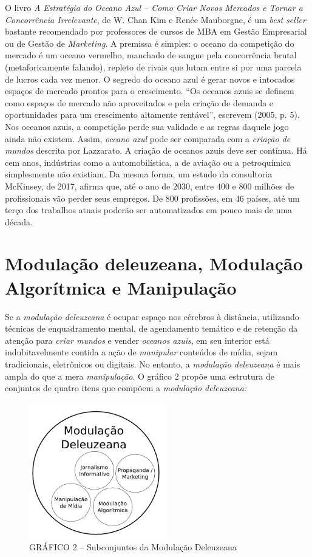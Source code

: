 O livro \emph{A Estratégia do Oceano Azul -- Como Criar Novos Mercados e
Tornar a Concorrência Irrelevante}, de W. Chan Kim e Renée Mauborgne, é
um \emph{best seller} bastante recomendado por professores de cursos de
MBA em Gestão Empresarial ou de Gestão de \emph{Marketing}. A premissa é
simples: o oceano da competição do mercado é um oceano vermelho,
manchado de sangue pela concorrência brutal (metaforicamente falando),
repleto de rivais que lutam entre si por uma parcela de lucros cada vez
menor. O segredo do oceano azul é gerar novos e intocados espaços de
mercado prontos para o crescimento. ``Os oceanos azuis se definem como
espaços de mercado não aproveitados e pela criação de demanda e
oportunidades para um crescimento altamente rentável'', escrevem (2005,
p. 5). Nos oceanos azuis, a competição perde sua validade e as regras
daquele jogo ainda não existem. Assim, \emph{oceano azul} pode ser
comparada com a \emph{criação de mundos} descrita por Lazzarato. A
criação de oceanos azuis deve ser contínua. Há cem anos, indústrias como
a automobilística, a de aviação ou a petroquímica simplesmente não
existiam. Da mesma forma, um estudo da consultoria McKinsey, de 2017,
afirma que, até o ano de 2030, entre 400 e 800 milhões de profissionais
vão perder seus empregos. De 800 profissões, em 46 países, até um terço
dos trabalhos atuais poderão ser automatizados em pouco mais de uma
década.

\section{Modulação deleuzeana, Modulação Algorítmica e Manipulação}

Se a \emph{modulação deleuzeana} é ocupar espaço nos cérebros à
distância, utilizando técnicas de enquadramento mental, de agendamento
temático e de retenção da atenção para \emph{criar mundos} e vender
\emph{oceanos azuis}, em seu interior está indubitavelmente contida a
ação de \emph{manipular} conteúdos de mídia, sejam tradicionais,
eletrônicos ou digitais. No entanto, a \emph{modulação deleuzeana} é
mais ampla do que a mera \emph{manipulação}. O gráfico 2 propõe uma
estrutura de conjuntos de quatro itens que compõem a \emph{modulação
deleuzeana:}



\begin{figure}[!ht]
\centering
  \includegraphics[width=60mm]{./imgs/grafico2.png}
\caption{GRÁFICO 2 -- Subconjuntos da Modulação Deleuzeana}
 \end{figure}

